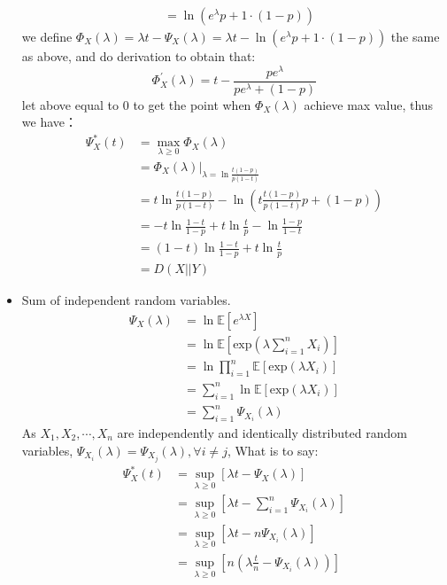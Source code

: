\documentclass[12pt]{article}
\newenvironment{solution}[2][Solution]{\begin{trivlist}
\item[\hskip \labelsep {\bfseries #1}\hskip \labelsep {\bfseries #2.}]}{\end{trivlist}}
\begin{document}
\begin{solution}{2}
\begin{itemize}
\begin{align*}
            & = \ln (e^\lambda p + 1 \cdot (1-p))
        \end{align*}
        we define $\Phi_X(\lambda) = \lambda t - \Psi_X(\lambda) = \lambda t - \ln (e^\lambda p + 1 \cdot (1-p))$ the same as above, and do derivation to obtain that:
        \[\Phi_X^{\prime}(\lambda) = t - \frac{pe^\lambda}{pe^\lambda+(1-p)}\]
        let above equal to 0 to get the point when $\Phi_X(\lambda)$ achieve max value, thus we have：
        \begin{align*}
            \Psi_X^*(t) & = \max_{\lambda \ge 0}\Phi_X(\lambda) \\
            & = \Phi_X(\lambda)|_{\lambda=\ln \frac{t(1-p)}{p(1-t)}} \\
            & = t\ln \frac{t(1-p)}{p(1-t)} - \ln(t\frac{t(1-p)}{p(1-t)}p + (1-p)) \\
            & = -t\ln \frac{1-t}{1-p}+t\ln\frac{t}{p}-\ln\frac{1-p}{1-t} \\
            & = (1-t)\ln \frac{1-t}{1-p}+t\ln\frac{t}{p} \\
            & = D(X||Y)
        \end{align*}
        \item Sum of independent random variables.
        \begin{align*}
            \Psi_X(\lambda) & = \ln \mathbb{E}[e^{\lambda X}] \\
            & = \ln \mathbb{E}[\mathrm{exp}(\lambda \sum_{i=1}^n X_i)] \\
            & = \ln \prod_{i=1}^n \mathbb{E}[\mathrm{exp}(\lambda X_i)] \\
            & = \sum_{i=1}^n \ln \mathbb{E}[\mathrm{exp}(\lambda X_i)] \\
            & = \sum_{i=1}^n \Psi_{X_i}(\lambda)
        \end{align*}
        As $X_1, X_2, \cdots, X_n$ are independently and identically distributed random variables, $\Psi_{X_i}(\lambda) = \Psi_{X_j}(\lambda), \forall i \neq j$,
        What is to say:
        \begin{align*}
            \Psi_X^*(t) & = \sup_{\lambda \ge 0}[\lambda t - \Psi_X(\lambda)] \\
            & = \sup_{\lambda \ge 0}[\lambda t -\sum_{i=1}^n \Psi_{X_i}(\lambda)] \\
            & = \sup_{\lambda \ge 0}[\lambda t - n\Psi_{X_i}(\lambda)] \\
            & = \sup_{\lambda \ge 0}[n(\lambda \frac{t}{n} - \Psi_{X_i}(\lambda))] \\

\end{align*}
\end{itemize}
\end{solution}
\end{document}
